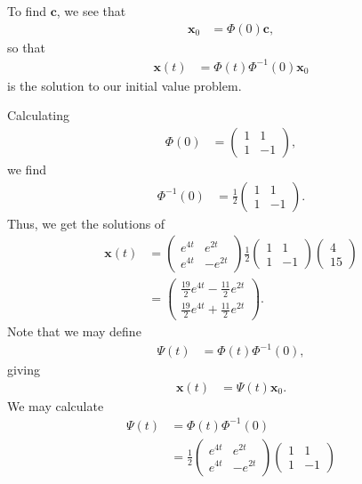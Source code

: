 \documentclass[10pt]{mypackage}
\begin{document}
\begin{example}
  To find $\mathbf{c}$, we see that
  \begin{align*}
    \mathbf{x}_0 &= \Phi(0)\mathbf{c},
  \end{align*}
  so that
  \begin{align*}
    \mathbf{x}(t) &= \Phi(t)\Phi^{-1}(0)\mathbf{x}_0
  \end{align*}
  is the solution to our initial value problem.\newline

  Calculating
  \begin{align*}
    \Phi(0) &= \begin{pmatrix}1 & 1 \\ 1 & -1\end{pmatrix},
  \end{align*}
  we find
  \begin{align*}
    \Phi^{-1}(0) &= \frac{1}{2} \begin{pmatrix}1 & 1\\1 & -1\end{pmatrix}.
  \end{align*}
  Thus, we get the solutions of
  \begin{align*}
    \mathbf{x}(t) &= \begin{pmatrix}e^{4t} & e^{2t} \\ e^{4t} & -e^{2t} \end{pmatrix} \frac{1}{2}\begin{pmatrix}1 & 1 \\ 1 & -1\end{pmatrix} \begin{pmatrix}4\\15\end{pmatrix}\\
                  &= \begin{pmatrix}\frac{19}{2}e^{4t} - \frac{11}{2}e^{2t} \\ \frac{19}{2}e^{4t} + \frac{11}{2}e^{2t}\end{pmatrix}.
  \end{align*}
  Note that we may define
  \begin{align*}
    \Psi(t) &= \Phi(t) \Phi^{-1}(0),
  \end{align*}
  giving
  \begin{align*}
    \mathbf{x}(t) &= \Psi(t)\mathbf{x}_0.
  \end{align*}
  We may calculate
  \begin{align*}
    \Psi(t) &= \Phi(t) \Phi^{-1}(0)\\
            &= \frac{1}{2} \begin{pmatrix}e^{4t} & e^{2t} \\ e^{4t} & -e^{2t}\end{pmatrix} \begin{pmatrix}1 & 1 \\ 1 & -1\end{pmatrix}\\

\end{align*}
\end{example}
\end{document}
